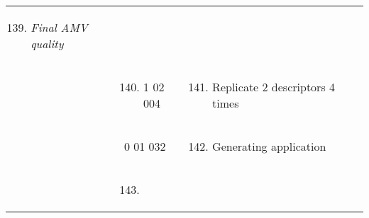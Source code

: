 \begin{longtable}[]{@{}llll@{}}
\begin{minipage}[t]{0.22\columnwidth}
\begin{enumerate}
\setcounter{enumi}{138}
\item
  \emph{Final AMV quality}
\end{enumerate}\strut
\end{minipage} & \begin{minipage}[t]{0.22\columnwidth}\raggedright
\strut
\end{minipage}\tabularnewline
\begin{minipage}[t]{0.22\columnwidth}\raggedright
\strut
\end{minipage} & \begin{minipage}[t]{0.22\columnwidth}\raggedright
\begin{enumerate}
\setcounter{enumi}{139}
\item
  1 02 004
\end{enumerate}\strut
\end{minipage} & \begin{minipage}[t]{0.22\columnwidth}\raggedright
\begin{enumerate}
\setcounter{enumi}{140}
\item
  Replicate 2 descriptors 4 times
\end{enumerate}\strut
\end{minipage} & \begin{minipage}[t]{0.22\columnwidth}\raggedright
\strut
\end{minipage}\tabularnewline
\begin{minipage}[t]{0.22\columnwidth}\raggedright
\strut
\end{minipage} & \begin{minipage}[t]{0.22\columnwidth}\raggedright
0 01 032\strut
\end{minipage} & \begin{minipage}[t]{0.22\columnwidth}\raggedright
\begin{enumerate}
\setcounter{enumi}{141}
\item
  Generating application
\end{enumerate}\strut
\end{minipage} & \begin{minipage}[t]{0.22\columnwidth}\raggedright
\strut
\end{minipage}\tabularnewline
\begin{minipage}[t]{0.22\columnwidth}\raggedright
\strut
\end{minipage} & \begin{minipage}[t]{0.22\columnwidth}\raggedright
\begin{enumerate}
\setcounter{enumi}{142}
\item

\end{enumerate}
\end{minipage}
\end{longtable}
